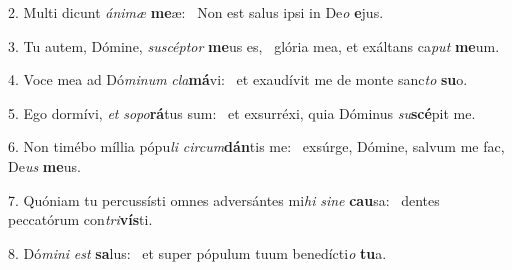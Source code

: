 2. Multi dicunt \textit{á}\textit{ni}\textit{mæ} \textbf{me}æ: \ast\  Non est salus ipsi in De\textit{o} \textbf{e}jus.\

3. Tu autem, Dómine, \textit{su}\textit{scép}\textit{tor} \textbf{me}us es, \ast\  glória mea, et exáltans ca\textit{put} \textbf{me}um.\

4. Voce mea ad Dó\textit{mi}\textit{num} \textit{cla}\textbf{má}vi: \ast\  et exaudívit me de monte sanc\textit{to} \textbf{su}o.\

5. Ego dormívi, \textit{et} \textit{so}\textit{po}\textbf{rá}tus sum: \ast\  et exsurréxi, quia Dóminus \textit{su}\textbf{scé}pit me.\

6. Non timébo míllia pópu\textit{li} \textit{cir}\textit{cum}\textbf{dán}tis me: \ast\  exsúrge, Dómine, salvum me fac, De\textit{us} \textbf{me}us.\

7. Quóniam tu percussísti omnes adversántes mi\textit{hi} \textit{si}\textit{ne} \textbf{cau}sa: \ast\  dentes peccatórum con\textit{tri}\textbf{vís}ti.\

8. Dó\textit{mi}\textit{ni} \textit{est} \textbf{sa}lus: \ast\  et super pópulum tuum benedícti\textit{o} \textbf{tu}a.\

